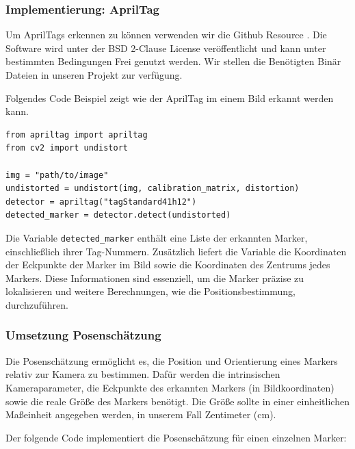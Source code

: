 \subsubsection{Implementierung: AprilTag}
Um AprilTags erkennen zu können verwenden wir die Github Resource \cite{apriltag_github}.
Die Software wird unter der BSD 2-Clause License veröffentlicht und kann unter bestimmten Bedingungen
Frei genutzt werden. Wir stellen die Benötigten Binär Dateien in unseren Projekt zur verfügung.

Folgendes Code Beispiel zeigt wie der AprilTag im einem Bild erkannt werden kann.


\begin{lstlisting}
from apriltag import apriltag
from cv2 import undistort

img = "path/to/image"
undistorted = undistort(img, calibration_matrix, distortion)
detector = apriltag("tagStandard41h12")
detected_marker = detector.detect(undistorted)
\end{lstlisting}


Die Variable \texttt{detected\_marker} enthält eine Liste der erkannten Marker, einschließlich ihrer Tag-Nummern.
Zusätzlich liefert die Variable die Koordinaten der Eckpunkte der Marker im Bild sowie 
die Koordinaten des Zentrums jedes Markers. Diese Informationen sind essenziell, um die Marker 
präzise zu lokalisieren und weitere Berechnungen, wie die Positionsbestimmung, durchzuführen.



\subsubsection{Umsetzung Posenschätzung}
Die Posenschätzung ermöglicht es, die Position und Orientierung eines Markers relativ zur Kamera
zu bestimmen. Dafür werden die intrinsischen Kameraparameter, die Eckpunkte des erkannten 
Markers (in Bildkoordinaten) sowie die reale Größe des Markers benötigt. Die Größe sollte 
in einer einheitlichen Maßeinheit angegeben werden, in unserem Fall Zentimeter (cm). \clearpage

Der folgende Code implementiert die Posenschätzung für einen einzelnen Marker:

